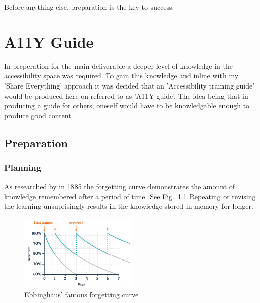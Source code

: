 \begin{savequote}[75mm]
Before anything else, preparation is the key to success.
\end{savequote}

\chapter{A11Y Guide}
In preperation for the main deliverable a deeper level of knowledge in the
accessibility space was required. To gain this knowledge and inline with my
'Share Everything' approach it was decided that an 'Accessibility
training guide' would be produced here on referred to as 'A11Y guide'. The idea
being that in producing a guide for others, oneself would have to be
knowledgable enough to produce good content.

\section{Preparation}
\subsection{Planning}

As researched by \citep{Ebbinghaus} in 1885 the forgetting curve demonstrates the
amount of knowledge remembered after a period of time. See Fig.~\ref{fig:ebbinghaus}
Repeating or revising the learning unsuprisingly results in the knowledge
stored in memory for longer.

\begin{figure}[H]
\centering
\includegraphics[width=0.5\textwidth]{figures/ebbinghaus}
\captionsetup{justification=centering}
\caption{Ebbinghaus' famous forgetting curve
\label{fig:ebbinghaus}}
\end{figure}

